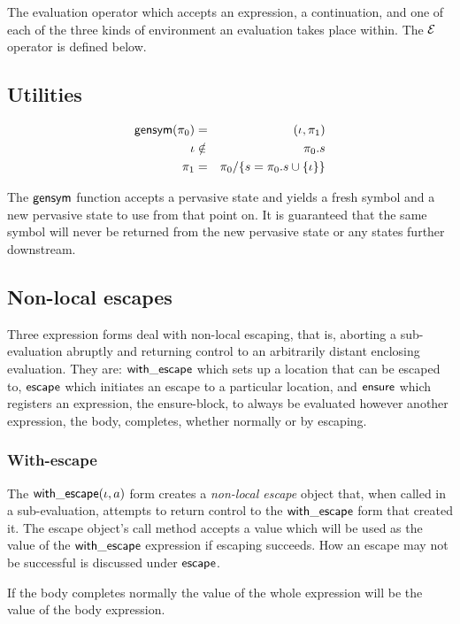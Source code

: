 \documentclass{article}
\begin{document}
The evaluation operator which accepts an expression, a continuation, and one of
each of the three kinds of environment an evaluation takes place within. The
$\mathcal{E}$ operator is defined below.

\subsection{Utilities}

\begin{eqnarray*}
\mathsf{gensym}(\pi_0) & = & (\iota, \pi_1) \\
\iota & \notin & \pi_0.s \\
\pi_1 & = & \pi_0 / \{ s = \pi_0.s \cup \{ \iota \} \}
\end{eqnarray*}

The $\mathsf{gensym}$ function accepts a pervasive state and yields a fresh symbol
and a new pervasive state to use from that point on. It is guaranteed that the
same symbol will never be returned from the new pervasive state or any states
further downstream.

\subsection{Non-local escapes}

Three expression forms deal with non-local escaping, that is, aborting a
sub-evaluation abruptly and returning control to an arbitrarily distant
enclosing evaluation.  They are: $\mathsf{with\_escape}$ which sets up a location
that can be escaped to, $\mathsf{escape}$ which initiates an escape to a particular
location, and $\mathsf{ensure}$ which registers an expression, the ensure-block, to
always be evaluated however another expression, the body, completes, whether
normally or by escaping.

\subsubsection{With-escape}

The $\mathsf{with\_escape}(\iota, a) $ form creates a \emph{non-local escape} object
that, when called in a sub-evaluation, attempts to return control to the
$\mathsf{with\_escape}$ form that created it. The escape object's call method
accepts a value which will be used as the value of the $\mathsf{with\_escape}$
expression if escaping succeeds. How an escape may not be successful is
discussed under $\mathsf{escape}$.

If the body completes normally the value of the whole expression will be the
value of the body expression.
\end{document}
